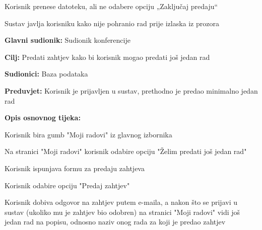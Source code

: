 \begin{packed_item}
\begin{packed_item}
							\item[3.b]  Korisnik prenese datoteku, ali ne odabere opciju „Zaključaj predaju“
							\item[] \begin{packed_enum}
								
								\item Sustav javlja korisniku kako nije pohranio rad prije izlaska iz prozora
								
							\end{packed_enum}
							
						\end{packed_item}
			
					\end{packed_item}

					\noindent {}
					\begin{packed_item}
	
						\item \textbf{Glavni sudionik: } Sudionik konferencije
						\item  \textbf{Cilj:} Predati zahtjev kako bi korisnik mogao predati još jedan rad
						\item  \textbf{Sudionici:} Baza podataka
						\item  \textbf{Preduvjet:} Korisnik je prijavljen u sustav, prethodno je predao minimalno jedan rad
						\item  \textbf{Opis osnovnog tijeka:}
						
						\item[] \begin{packed_enum}
							\item Korisnik bira gumb "Moji radovi" iz glavnog izbornika
							\item Na stranici "Moji radovi" korisnik odabire opciju "Želim predati još jedan rad"
							\item Korisnik ispunjava formu za predaju zahtjeva
							\item Korisnik odabire opciju "Predaj zahtjev"
							\item Korisnik dobiva odgovor na zahtjev putem e-maila, a nakon što se prijavi u sustav (ukoliko mu je zahtjev bio odobren) na stranici "Moji radovi" vidi još jedan rad na popisu, odnosno naziv onog rada za koji je predao zahtjev

					
						\end{packed_enum}
			
					\end{packed_item}

